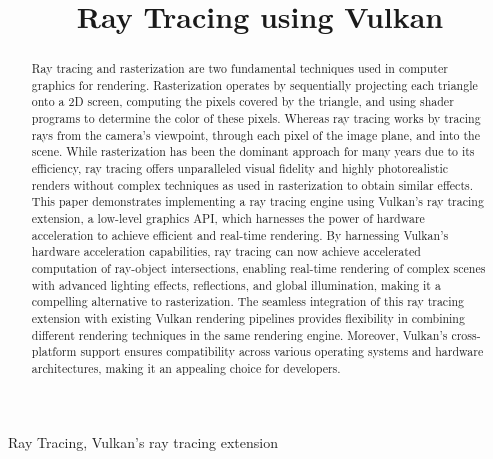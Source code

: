 \documentclass[conference]{IEEEtran}
\begin{document}
\title{Ray Tracing using Vulkan}

\author{
}

\maketitle

\begin{abstract}
    Ray tracing and rasterization are two fundamental techniques used in computer graphics for rendering. 
    Rasterization operates by sequentially projecting each triangle onto a 2D screen, computing the pixels covered by the triangle, and using shader programs to determine the color of these pixels. Whereas ray tracing works by tracing rays from the camera's viewpoint, through each pixel of the image plane, and into the scene. While rasterization has been the dominant approach for many years due to its efficiency, ray tracing offers unparalleled visual fidelity and highly photorealistic renders without complex techniques as used in rasterization to obtain similar effects. This paper demonstrates implementing a ray tracing engine using Vulkan's ray tracing extension, a low-level graphics API, which harnesses the power of hardware acceleration to achieve efficient and real-time rendering. By harnessing Vulkan's hardware acceleration capabilities, ray tracing can now achieve accelerated computation of ray-object intersections, enabling real-time rendering of complex scenes with advanced lighting effects, reflections, and global illumination, making it a compelling alternative to rasterization. The seamless integration of this ray tracing extension with existing Vulkan rendering pipelines provides flexibility in combining different rendering techniques in the same rendering engine. Moreover, Vulkan's cross-platform support ensures compatibility across various operating systems and hardware architectures, making it an appealing choice for developers. 
\end{abstract}

\begin{IEEEkeywords}
Ray Tracing, Vulkan's ray tracing extension
\end{IEEEkeywords}
\end{document}
